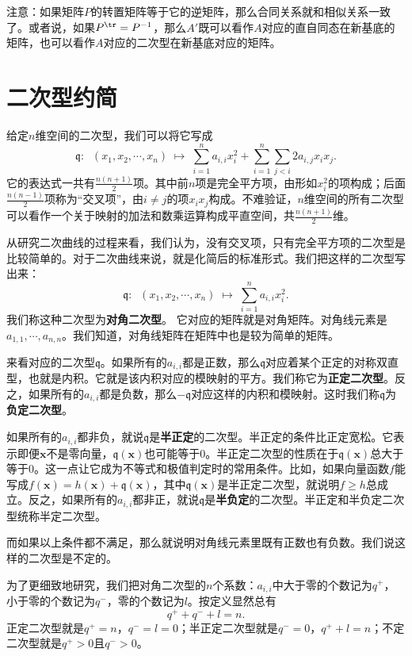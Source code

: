 \documentclass[12pt,UTF8]{ctexbook}
\begin{document}
注意：如果矩阵$P$的转置矩阵等于它的逆矩阵，那么合同关系就和相似关系一致了。或者说，如果$P^{\tr} = P^{-1}$，那么$A'$既可以看作$A$对应的直自同态在新基底的矩阵，也可以看作$A$对应的二次型在新基底对应的矩阵。

\section{二次型约简}
给定$n$维空间的二次型，我们可以将它写成
$$ \mathfrak{q}:\;\; (x_1, x_2, \cdots, x_n) \; \mapsto \; \sum_{i=1}^n a_{i,i} x_i^2 + \sum_{i=1}^n \sum_{j<i} 2a_{i,j} x_i x_j. $$
它的表达式一共有$\frac{n(n+1)}{2}$项。其中前$n$项是完全平方项，由形如$x_i^2$的项构成；后面$\frac{n(n-1)}{2}$项称为“交叉项”，由$i\neq j$的项$x_i x_j$构成。不难验证，$n$维空间的所有二次型可以看作一个关于映射的加法和数乘运算构成平直空间，共$\frac{n(n+1)}{2}$维。

从研究二次曲线的过程来看，我们认为，没有交叉项，只有完全平方项的二次型是比较简单的。对于二次曲线来说，就是化简后的标准形式。我们把这样的二次型写出来：
$$ \mathfrak{q}:\;\; (x_1, x_2, \cdots, x_n) \; \mapsto \; \sum_{i=1}^n a_{i,i} x_i^2 . $$
我们称这种二次型为\textbf{对角二次型}。
它对应的矩阵就是对角矩阵。对角线元素是$a_{1,1}, \cdots, a_{n,n}$。我们知道，对角线矩阵在矩阵中也是较为简单的矩阵。

来看对应的二次型$\mathfrak{q}$。如果所有的$a_{i,i}$都是正数，那么$\mathfrak{q}$对应着某个正定的对称双直型，也就是内积。它就是该内积对应的模映射的平方。我们称它为\textbf{正定二次型}。反之，如果所有的$a_{i,i}$都是负数，那么$-\mathfrak{q}$对应这样的内积和模映射。这时我们称$\mathfrak{q}$为\textbf{负定二次型}。

如果所有的$a_{i,i}$都非负，就说$\mathfrak{q}$是\textbf{半正定}的二次型。半正定的条件比正定宽松。它表示即便$\mathbf{x}$不是零向量，$\mathfrak{q}(\mathbf{x})$也可能等于$0$。半正定二次型的性质在于$\mathfrak{q}(\mathbf{x})$总大于等于$0$。这一点让它成为不等式和极值判定时的常用条件。比如，如果向量函数$f$能写成$f(\mathbf{x}) = h(\mathbf{x}) + \mathfrak{q}(\mathbf{x})$，其中$\mathfrak{q}(\mathbf{x})$是半正定二次型，就说明$f\geqslant h$总成立。反之，如果所有的$a_{i,i}$都非正，就说$\mathfrak{q}$是\textbf{半负定}的二次型。半正定和半负定二次型统称半定二次型。

而如果以上条件都不满足，那么就说明对角线元素里既有正数也有负数。我们说这样的二次型是不定的。

为了更细致地研究，我们把对角二次型的$n$个系数：$a_{i,i}$中大于零的个数记为$q^+$，小于零的个数记为$q^-$，零的个数记为$l$。按定义显然总有
$$ q^+ + q^- + l = n.$$
正定二次型就是$q^+ = n$，$q^- = l = 0$；半正定二次型就是$q^- = 0$，$q^+ + l = n$；不定二次型就是$q^+ > 0$且$q^- > 0$。
\end{document}
